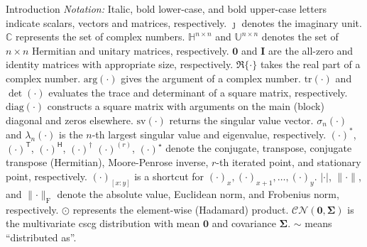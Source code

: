 \documentclass[journal]{IEEEtran}
\begin{document}
\begin{section}{Introduction}
	\emph{Notation:}
	Italic, bold lower-case, and bold upper-case letters indicate scalars, vectors and matrices, respectively.
	$\jmath$ denotes the imaginary unit.
	$\mathbb{C}$ represents the set of complex numbers.
	$\mathbb{H}^{n \times n}$ and $\mathbb{U}^{n \times n}$ denotes the set of $n \times n$ Hermitian and unitary matrices, respectively.
	$\mathbf{0}$ and $\mathbf{I}$ are the all-zero and identity matrices with appropriate size, respectively.
	$\Re\{\cdot\}$ takes the real part of a complex number.
	$\mathrm{arg}(\cdot)$ gives the argument of a complex number.
	$\mathrm{tr}(\cdot)$ and $\det(\cdot)$ evaluates the trace and determinant of a square matrix, respectively.
	$\mathrm{diag}(\cdot)$ constructs a square matrix with arguments on the main (block) diagonal and zeros elsewhere.
	$\mathrm{sv}(\cdot)$ returns the singular value vector.
	$\sigma_n(\cdot)$ and $\lambda_n(\cdot)$ is the $n$-th largest singular value and eigenvalue, respectively.
	$(\cdot)^*$, $(\cdot)^\mathsf{T}$, $(\cdot)^\mathsf{H}$, $(\cdot)^\dagger$ $(\cdot)^{(r)}$, $(\cdot)^{\star}$ denote the conjugate, transpose, conjugate transpose (Hermitian), Moore-Penrose inverse, $r$-th iterated point, and stationary point, respectively.
	$(\cdot)_{[x:y]}$ is a shortcut for $(\cdot)_x,(\cdot)_{x+1},\ldots,(\cdot)_y$.
	$\lvert \cdot \rvert$, $\lVert \cdot \rVert$, and $\lVert \cdot \rVert _\mathrm{F}$ denote the absolute value, Euclidean norm, and Frobenius norm, respectively.
	$\odot$ represents the element-wise (Hadamard) product.
	$\mathcal{CN}(\mathbf{0}, \mathbf{\Sigma})$ is the multivariate \gls{cscg} distribution with mean $\mathbf{0}$ and covariance $\mathbf{\Sigma}$.
	$\sim$ means ``distributed as''.
\end{section}
\end{document}
